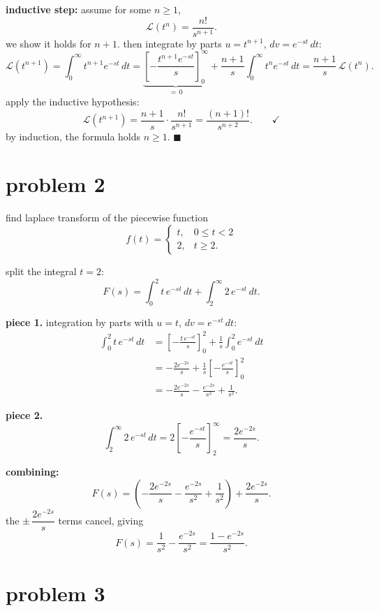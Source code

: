\documentclass[12pt]{article}
\begin{document}
\medskip
\textbf{inductive step:} assume for some $n \geq 1$,\
\[
  \mathcal{L}(t^n) = \frac{n!}{s^{n+1}}.
\]
we show it holds for $n+1$. then integrate by parts $u = t^{n+1}$,
$dv = e^{-st}\,dt$:
\[
  \mathcal{L}(t^{n+1})
  = \int_0^{\infty} t^{n+1} e^{-st}\, dt
  = \underbrace{\left[-\frac{t^{n+1}e^{-st}}{s}\right]_0^{\infty}}_{=\,0}
    + \frac{n+1}{s}\int_0^{\infty} t^n e^{-st}\, dt
  = \frac{n+1}{s}\,\mathcal{L}(t^n).
\]
apply the inductive hypothesis:
\[
  \mathcal{L}(t^{n+1}) = \frac{n+1}{s} \cdot \frac{n!}{s^{n+1}}
                        = \frac{(n+1)!}{s^{n+2}}. \qquad \checkmark
\]
by induction, the formula holds  $n \geq 1$. \hfill $\blacksquare$

\newpage
\section*{problem 2}

find laplace transform of the piecewise function
\[
  f(t) = \begin{cases} t, & 0 \le t < 2 \\ 2, & t \ge 2. \end{cases}
\]

split the integral $t = 2$:
\[
  F(s) = \int_0^{2} t\, e^{-st}\, dt + \int_2^{\infty} 2\, e^{-st}\, dt.
\]

\textbf{piece 1.} integration by parts with $u = t$, $dv = e^{-st}\,dt$:
\begin{align*}
  \int_0^{2} t\, e^{-st}\, dt
  &= \left[-\frac{t\,e^{-st}}{s}\right]_0^{2}
     + \frac{1}{s}\int_0^{2} e^{-st}\, dt \\
  &= -\frac{2e^{-2s}}{s}
     + \frac{1}{s}\left[-\frac{e^{-st}}{s}\right]_0^{2} \\
  &= -\frac{2e^{-2s}}{s}
     - \frac{e^{-2s}}{s^2}
     + \frac{1}{s^2}.
\end{align*}

\textbf{piece 2.}
\[
  \int_2^{\infty} 2\,e^{-st}\,dt
  = 2\left[-\frac{e^{-st}}{s}\right]_2^{\infty}
  = \frac{2e^{-2s}}{s}.
\]

\textbf{combining:}
\[
  F(s)
  = \left(-\frac{2e^{-2s}}{s} - \frac{e^{-2s}}{s^2} + \frac{1}{s^2}\right)
    + \frac{2e^{-2s}}{s}.
\]
the $\pm\,\dfrac{2e^{-2s}}{s}$ terms cancel, giving
\[
  \boxed{F(s) = \frac{1}{s^2} - \frac{e^{-2s}}{s^2} = \frac{1 - e^{-2s}}{s^2}.}
\]

\newpage
\section*{problem 3}
\end{document}
